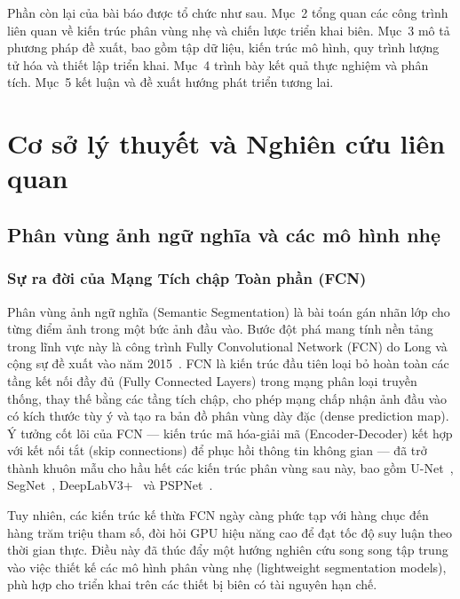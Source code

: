 \documentclass[conference]{IEEEtran}
\begin{document}
Phần còn lại của bài báo được tổ chức như sau. Mục~2 tổng quan các công trình liên quan về kiến trúc phân vùng nhẹ và chiến lược triển khai biên. Mục~3 mô tả phương pháp đề xuất, bao gồm tập dữ liệu, kiến trúc mô hình, quy trình lượng tử hóa và thiết lập triển khai. Mục~4 trình bày kết quả thực nghiệm và phân tích. Mục~5 kết luận và đề xuất hướng phát triển tương lai.


\section{Cơ sở lý thuyết và Nghiên cứu liên quan}

\subsection{Phân vùng ảnh ngữ nghĩa và các mô hình nhẹ}

\subsubsection{Sự ra đời của Mạng Tích chập Toàn phần (FCN)}

Phân vùng ảnh ngữ nghĩa (Semantic Segmentation) là bài toán gán nhãn lớp cho từng điểm ảnh trong một bức ảnh đầu vào. Bước đột phá mang tính nền tảng trong lĩnh vực này là công trình Fully Convolutional Network (FCN) do Long và cộng sự đề xuất vào năm 2015~\cite{long2015fully}. FCN là kiến trúc đầu tiên loại bỏ hoàn toàn các tầng kết nối đầy đủ (Fully Connected Layers) trong mạng phân loại truyền thống, thay thế bằng các tầng tích chập, cho phép mạng chấp nhận ảnh đầu vào có kích thước tùy ý và tạo ra bản đồ phân vùng dày đặc (dense prediction map). Ý tưởng cốt lõi của FCN --- kiến trúc mã hóa-giải mã (Encoder-Decoder) kết hợp với kết nối tắt (skip connections) để phục hồi thông tin không gian --- đã trở thành khuôn mẫu cho hầu hết các kiến trúc phân vùng sau này, bao gồm U-Net~\cite{ronneberger2015u}, SegNet~\cite{badrinarayanan2017segnet}, DeepLabV3+~\cite{chen2018encoder} và PSPNet~\cite{zhao2017pyramid}.

Tuy nhiên, các kiến trúc kế thừa FCN ngày càng phức tạp với hàng chục đến hàng trăm triệu tham số, đòi hỏi GPU hiệu năng cao để đạt tốc độ suy luận theo thời gian thực. Điều này đã thúc đẩy một hướng nghiên cứu song song tập trung vào việc thiết kế các mô hình phân vùng nhẹ (lightweight segmentation models), phù hợp cho triển khai trên các thiết bị biên có tài nguyên hạn chế.
\end{document}
